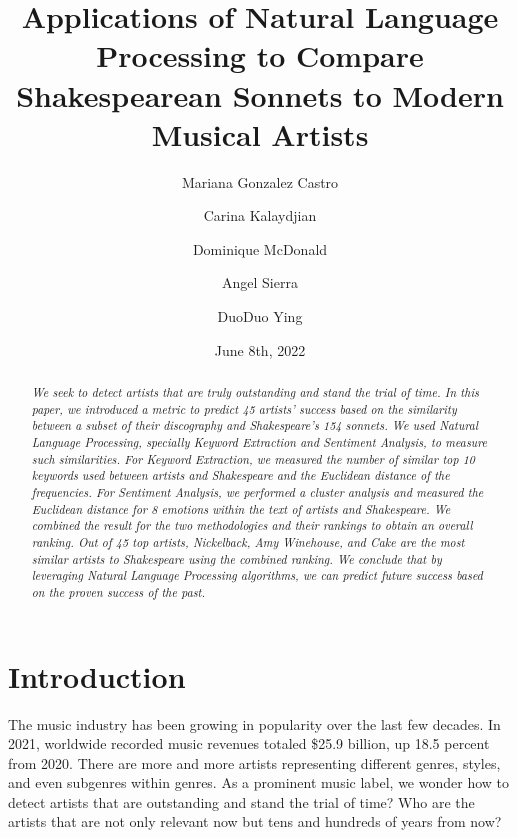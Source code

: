 \documentclass[10pt,a4paper]{article}
\title{Applications of Natural Language Processing to Compare Shakespearean Sonnets to Modern Musical Artists}
\author[*]{Mariana Gonzalez Castro}
\author[*]{Carina Kalaydjian}
\author[*]{Dominique McDonald}
\author[*]{Angel Sierra}
\author[*]{DuoDuo Ying}
\affil[*]{Department of Statistics, UCLA}
\date{June 8th, 2022}
\newcommand{\abstractinenglishname}{Abstract}
\newenvironment{abstractinenglish}{
        \def\abstractname{\abstractinenglishname}
	\begin{abstract}
}{
        \end{abstract}
}
\begin{document}
\maketitle
\vspace{6pt}

\begin{abstractinenglish}
\emph{We seek to detect artists that are truly outstanding and stand the trial of time. In this paper, we introduced a metric to predict 45 artists’ success based on the similarity between a subset of their discography and Shakespeare’s 154 sonnets. We used Natural Language Processing, specially Keyword Extraction and Sentiment Analysis, to measure such similarities. For Keyword Extraction, we measured the number of similar top 10 keywords used between artists and Shakespeare and the Euclidean distance of the frequencies. For Sentiment Analysis, we performed a cluster analysis and measured the Euclidean distance for 8 emotions within the text of artists and Shakespeare. We combined the result for the two methodologies and their rankings to obtain an overall ranking. Out of 45 top artists, Nickelback, Amy Winehouse, and Cake are the most similar artists to Shakespeare using the combined ranking. We conclude that by leveraging Natural Language Processing algorithms, we can predict future success based on the proven success of the past. }
\end{abstractinenglish}

\section{Introduction}
%


The music industry has been growing in popularity over the last few decades. In 2021, worldwide recorded music revenues totaled \$25.9 billion, up 18.5 percent from 2020. \cite{music-world}There are more and more artists representing different genres, styles, and even subgenres within genres. As a prominent music label, we wonder how to detect artists that are outstanding and stand the trial of time? Who are the artists that are not only relevant now but tens and hundreds of years from now?
\end{document}
